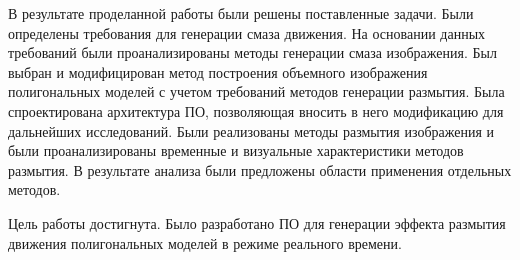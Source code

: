 \Conclusion %

В результате проделанной работы были решены поставленные задачи. Были определены требования для генерации смаза движения. На основании данных требований были проанализированы методы генерации смаза изображения. Был выбран и модифицирован метод построения объемного изображения полигональных моделей с учетом требований  методов генерации размытия. Была спроектирована архитектура ПО, позволяющая вносить в него модификацию для дальнейших исследований. Были реализованы методы размытия изображения и были проанализированы временные и визуальные характеристики методов размытия. В результате анализа были предложены области применения отдельных методов. 

Цель работы достигнута. Было разработано ПО для генерации эффекта размытия движения полигональных моделей в режиме реального времени.

